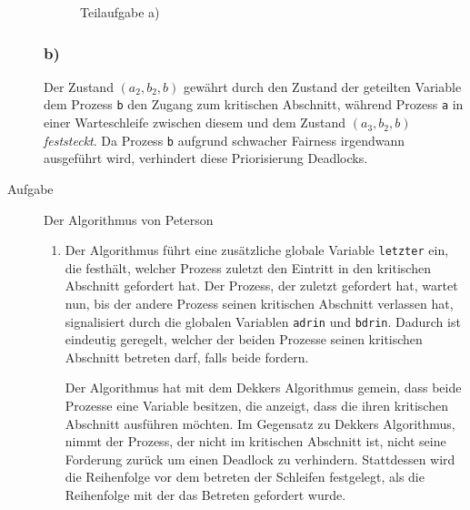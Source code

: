 \documentclass[a4paper,twoside,12pt,fleqn]{article}
\newcounter{AUFGNR}
\newcommand{\AUFGABE}[2]{\vspace{0.3cm}\item[Aufgabe~\arabic{AUFGNR}]\stepcounter{AUFGNR} #1\hfill\emph{#2}}
\begin{document}
\begin{description}
\begin{figure}[htbp]
		\caption{Teilaufgabe a)}
	\end{figure}
\subsubsection*{b)}
Der Zustand $(a_2, b_2, b)$ gewährt durch den Zustand der geteilten Variable dem Prozess \texttt{b} den Zugang zum kritischen Abschnitt, während Prozess \texttt{a} in einer Warteschleife zwischen diesem und dem Zustand $(a_3, b_2, b)$ \textit{feststeckt}. Da Prozess \texttt{b} aufgrund schwacher Fairness irgendwann ausgeführt wird, verhindert diese Priorisierung Deadlocks. 

\AUFGABE{Der Algorithmus von Peterson}{}
\begin{enumerate}
\item Der Algorithmus führt eine zusätzliche globale Variable \texttt{letzter} ein, die festhält, welcher Prozess zuletzt den Eintritt in den kritischen Abschnitt gefordert hat. Der Prozess, der zuletzt gefordert hat, wartet nun, bis der andere Prozess seinen kritischen Abschnitt verlassen hat, signalisiert durch die globalen Variablen \texttt{adrin} und \texttt{bdrin}. Dadurch ist eindeutig geregelt, welcher der beiden Prozesse seinen kritischen Abschnitt betreten darf, falls beide fordern. 

Der Algorithmus hat mit dem Dekkers Algorithmus gemein, dass beide Prozesse eine Variable besitzen, die anzeigt, dass die ihren kritischen Abschnitt ausführen möchten. Im Gegensatz zu Dekkers Algorithmus, nimmt der Prozess, der nicht im kritischen Abschnitt ist, nicht seine Forderung zurück um einen Deadlock zu verhindern. Stattdessen wird die Reihenfolge vor dem betreten der Schleifen festgelegt, als die Reihenfolge mit der das Betreten gefordert wurde.
\end{enumerate}


\end{description}
\end{document}

